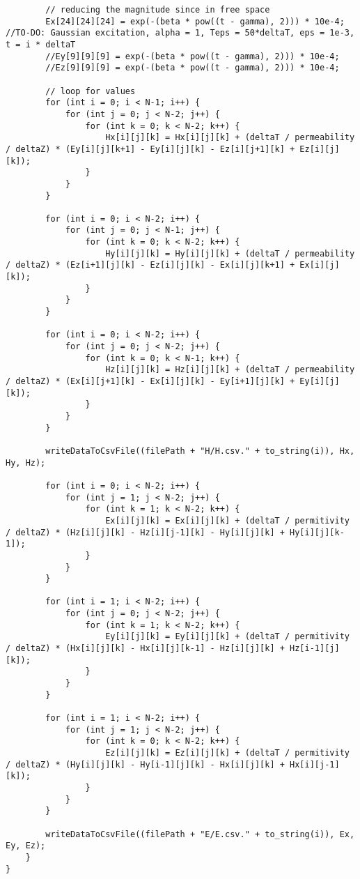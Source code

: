 \begin{verbatim}
		// reducing the magnitude since in free space
		Ex[24][24][24] = exp(-(beta * pow((t - gamma), 2))) * 10e-4;  //TO-DO: Gaussian excitation, alpha = 1, Teps = 50*deltaT, eps = 1e-3, t = i * deltaT
		//Ey[9][9][9] = exp(-(beta * pow((t - gamma), 2))) * 10e-4;
		//Ez[9][9][9] = exp(-(beta * pow((t - gamma), 2))) * 10e-4;
		
		// loop for values
		for (int i = 0; i < N-1; i++) {
			for (int j = 0; j < N-2; j++) {
				for (int k = 0; k < N-2; k++) {
					Hx[i][j][k] = Hx[i][j][k] + (deltaT / permeability / deltaZ) * (Ey[i][j][k+1] - Ey[i][j][k] - Ez[i][j+1][k] + Ez[i][j][k]);
				}
			}
		}
		
		for (int i = 0; i < N-2; i++) {
			for (int j = 0; j < N-1; j++) {
				for (int k = 0; k < N-2; k++) {
					Hy[i][j][k] = Hy[i][j][k] + (deltaT / permeability / deltaZ) * (Ez[i+1][j][k] - Ez[i][j][k] - Ex[i][j][k+1] + Ex[i][j][k]);
				}
			}
		}
		
		for (int i = 0; i < N-2; i++) {
			for (int j = 0; j < N-2; j++) {
				for (int k = 0; k < N-1; k++) {
					Hz[i][j][k] = Hz[i][j][k] + (deltaT / permeability / deltaZ) * (Ex[i][j+1][k] - Ex[i][j][k] - Ey[i+1][j][k] + Ey[i][j][k]);
				}
			}
		}
		
		writeDataToCsvFile((filePath + "H/H.csv." + to_string(i)), Hx, Hy, Hz);
		
		for (int i = 0; i < N-2; i++) {
			for (int j = 1; j < N-2; j++) {
				for (int k = 1; k < N-2; k++) {
					Ex[i][j][k] = Ex[i][j][k] + (deltaT / permitivity / deltaZ) * (Hz[i][j][k] - Hz[i][j-1][k] - Hy[i][j][k] + Hy[i][j][k-1]);
				}
			}
		}
		
		for (int i = 1; i < N-2; i++) {
			for (int j = 0; j < N-2; j++) {
				for (int k = 1; k < N-2; k++) {
					Ey[i][j][k] = Ey[i][j][k] + (deltaT / permitivity / deltaZ) * (Hx[i][j][k] - Hx[i][j][k-1] - Hz[i][j][k] + Hz[i-1][j][k]);
				}
			}
		}
		
		for (int i = 1; i < N-2; i++) {
			for (int j = 1; j < N-2; j++) {
				for (int k = 0; k < N-2; k++) {
					Ez[i][j][k] = Ez[i][j][k] + (deltaT / permitivity / deltaZ) * (Hy[i][j][k] - Hy[i-1][j][k] - Hx[i][j][k] + Hx[i][j-1][k]);
				}
			}
		}
		
		writeDataToCsvFile((filePath + "E/E.csv." + to_string(i)), Ex, Ey, Ez);
	}
}
\end{verbatim}

